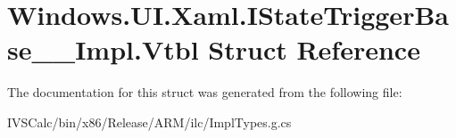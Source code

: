 \hypertarget{struct_windows_1_1_u_i_1_1_xaml_1_1_i_state_trigger_base_____impl_1_1_vtbl}{}\section{Windows.\+U\+I.\+Xaml.\+I\+State\+Trigger\+Base\+\_\+\+\_\+\+Impl.\+Vtbl Struct Reference}
\label{struct_windows_1_1_u_i_1_1_xaml_1_1_i_state_trigger_base_____impl_1_1_vtbl}


The documentation for this struct was generated from the following file\+:\begin{DoxyCompactItemize}
\item 
I\+V\+S\+Calc/bin/x86/\+Release/\+A\+R\+M/ilc/Impl\+Types.\+g.\+cs\end{DoxyCompactItemize}

